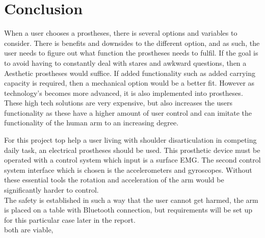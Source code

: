 \section{Conclusion}
When a user chooses a prostheses, there is several options and variables to consider. 
There is benefits and downsides to the different option, and as such, the user needs to figure out what function the prostheses needs to fulfil. 
If the goal is to avoid having to constantly deal with stares and awkward questions, then a Aesthetic prostheses would suffice. 
If added functionality such as added carrying capacity is required, then a mechanical option would be a better fit.
However as technology's becomes more advanced, it is also implemented into prostheses. These high tech solutions are very expensive, but also increases the users functionality as these have a higher amount of user control and can imitate the functionality of the human arm to an increasing degree.

For this project top help a user living with shoulder disarticulation in competing daily task, an electrical prostheses should be used. This prosthetic device must be operated with a control system which input is a surface EMG. 
The second control system interface which is chosen is the accelerometers and gyroscopes. Without these essential tools  the rotation and acceleration of the arm would be significantly harder to control.\\ 
The safety is established in such a way that the user cannot get harmed, the arm is placed on a table with Bluetooth connection, but requirements will be set up for this particular case later in the report.\\

both are viable,